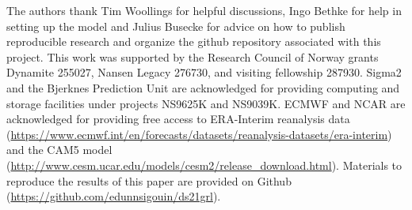 \documentclass[draft]{agujournal2019}
\begin{document}
%




%
%
%
%
%
%
%


\acknowledgments
The authors thank Tim Woollings for helpful discussions, Ingo Bethke for help in setting up the model and Julius Busecke for advice on how to publish reproducible research and organize the github repository associated with this project. This work was supported by the Research Council of Norway grants Dynamite 255027, Nansen Legacy 276730, and visiting fellowship 287930. Sigma2 and the Bjerknes Prediction Unit are acknowledged for providing computing and storage facilities under projects NS9625K and NS9039K. ECMWF and NCAR are acknowledged for providing free access to ERA-Interim reanalysis data (\url{https://www.ecmwf.int/en/forecasts/datasets/reanalysis-datasets/era-interim}) and the CAM5 model (\url{http://www.cesm.ucar.edu/models/cesm2/release_download.html}). Materials to reproduce the results of this paper are provided on Github (\url{https://github.com/edunnsigouin/ds21grl}).
\end{document}
